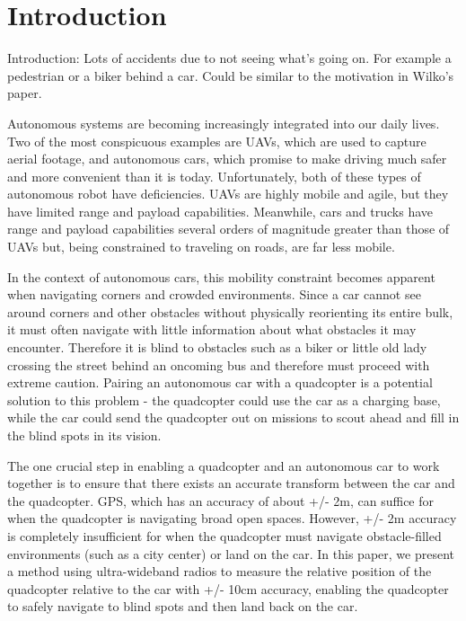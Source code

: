 
\section{Introduction}

Introduction: Lots of accidents due to not seeing what's going on. For example a pedestrian or a biker behind a car. Could be similar to the motivation in Wilko's paper.

Autonomous systems are becoming increasingly integrated into
our daily lives. Two of the most conspicuous examples are UAVs,
which are used to capture aerial footage, and autonomous cars,
which promise to make driving much safer and more convenient
than it is today. Unfortunately, both of these types of autonomous
robot have deficiencies. UAVs are highly mobile and agile, but they
have limited range and payload capabilities. Meanwhile, cars and trucks
have range and payload capabilities several orders of magnitude greater than
those of UAVs but, being constrained to traveling on roads, are far less mobile.

In the context of autonomous cars, this mobility constraint becomes apparent
when navigating corners and crowded environments. Since a car cannot
see around corners and other obstacles without physically reorienting its
entire bulk, it must often navigate with little information about what obstacles
it may encounter. Therefore it is blind to obstacles such as a biker or little old
lady crossing the street behind an oncoming bus and therefore must proceed
with extreme caution. Pairing an autonomous car with a quadcopter is a potential
solution to this problem - the quadcopter could use the car as a charging base,
while the car could send the quadcopter out on missions to scout ahead and
fill in the blind spots in its vision.

The one crucial step in enabling a quadcopter and an autonomous car to work
together is to ensure that there exists an accurate transform between the car
and the quadcopter. GPS, which has an accuracy of about +/- 2m, can suffice
for when the quadcopter is navigating broad open spaces. However, +/- 2m
accuracy is completely insufficient for when the quadcopter must navigate
obstacle-filled environments (such as a city center) or land on the car. In this 
paper, we present a method using ultra-wideband radios to measure the relative 
position of the quadcopter relative to the car with +/- 10cm accuracy, enabling 
the quadcopter to safely navigate to blind spots and then land back on the car.

